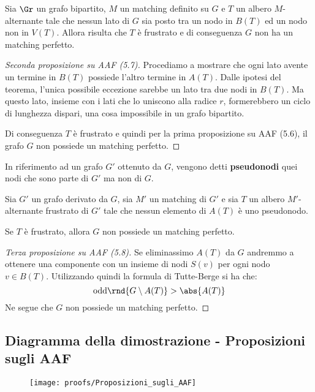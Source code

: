 \documentclass[\main/main.tex]{subfiles}
\begin{document}
\begin{proposition}
	Sia \(\Gr \) un grafo bipartito, \(M\) un matching definito su \(G\) e \(T\) un albero \(M\)-alternante tale che nessun lato di \(G\) sia posto tra un nodo in \(B(T)\) ed un nodo non in \(V(T)\). Allora risulta che \(T\) è frustrato e di conseguenza \(G\) non ha un matching perfetto.
\end{proposition}
\begin{proof}[Seconda proposizione su AAF (5.7)]
	Procediamo a mostrare che ogni lato avente un termine in \(B(T)\) possiede l'altro termine in \(A(T)\). Dalle ipotesi del teorema, l'unica possibile eccezione sarebbe un lato tra due nodi in \(B(T)\). Ma questo lato, insieme con i lati che lo uniscono alla radice \(r\), formerebbero un ciclo di lunghezza dispari, una cosa impossibile in un grafo bipartito.

	Di conseguenza \(T\) è frustrato e quindi per la prima proposizione su AAF (5.6), il grafo \(G\) non possiede un matching perfetto.
\end{proof}
\begin{definition}[Pseudonodo]
	In riferimento ad un grafo \(G'\) ottenuto da \(G\), vengono detti \textbf{pseudonodi} quei nodi che sono parte di \(G'\) ma non di \(G\).
\end{definition}
\begin{proposition}
	Sia \(G'\) un grafo derivato da \(G\), sia \(M'\) un matching di \(G'\) e sia \(T\) un albero \(M'\)-alternante frustrato di \(G'\) tale che nessun elemento di \(A(T)\) è uno pseudonodo.

	Se \(T\) è frustrato, allora \(G\) non possiede un matching perfetto.
\end{proposition}
\begin{proof}[Terza proposizione su AAF (5.8)]
	Se eliminassimo \(A(T)\) da \(G\) andremmo a ottenere una componente con un insieme di nodi \(S(v)\) per ogni nodo \(v \in B(T)\). Utilizzando quindi la formula di Tutte-Berge si ha che:
	\[
		\text{odd}\rnd{G \setminus A(T)} > \abs{A(T)}
	\]
	Ne segue che \(G\) non possiede un matching perfetto.
\end{proof}
\clearpage
\subsection{Diagramma della dimostrazione - Proposizioni sugli AAF}
\begin{figure}
	\texttt{[image: proofs/Proposizioni\_sugli\_AAF]}
\end{figure}
\clearpage
\end{document}
